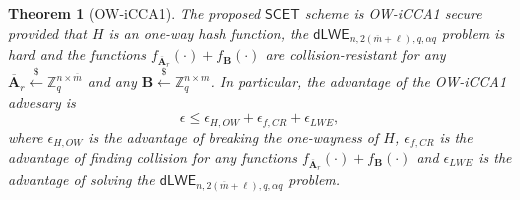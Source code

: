 \documentclass[a4paper,11pt,onecolumn]{elsarticle}
\newtheorem{theorem}{Theorem}
\begin{document}
	
		
		\begin{theorem}[OW-iCCA1] \label{owtheorem}
			The proposed $\mathsf{SCET}$ scheme is OW-iCCA1 secure provided that $H$ is an one-way hash function, the $\mathsf{dLWE}_{n,2(\overline{m}+\ell), q,\alpha q}$ problem is hard and the functions $ f_{\overline{\textbf{A}}_{r}}(\cdot)+f_{\textbf{B}}(\cdot)$ are collision-resistant for any $\overline{\mathbf{A}}_r \xleftarrow{\$} \mathbb{Z}_q^{n \times\overline{ m}}$ and any $\mathbf{B} \xleftarrow{\$} \mathbb{Z}_q^{n \times m}$. In particular, the advantage of the OW-iCCA1 advesary is 
			$$\epsilon \leq \epsilon_{H,OW}+ \epsilon_{f,CR}+\epsilon_{LWE},$$
		where	$\epsilon_{H,OW}$ is the advantage of breaking the one-wayness of $H$,  $\epsilon_{f,CR}$ is the advantage of  finding collision for any functions $ f_{\overline{\textbf{A}}_{r}}(\cdot)+f_{\textbf{B}}(\cdot)$ and $\epsilon_{LWE}$ is the advantage of solving the  $\mathsf{dLWE}_{n,2(\overline{m}+\ell), q,\alpha q}$ problem. 
			
		\end{theorem}
		
\end{document}
